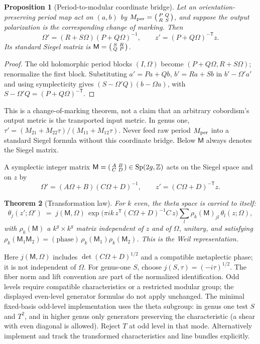 \documentclass[11pt]{article}
\newtheorem{theorem}{Theorem}[section]
\newtheorem{proposition}[theorem]{Proposition}
\theoremstyle{definition}
\theoremstyle{remark}
\newcommand{\Z}{\mathbb{Z}}
\newcommand{\R}{\mathbb{R}}
\newcommand{\C}{\mathbb{C}}
\newcommand{\Sp}{\operatorname{Sp}}
\begin{document}
\begin{proposition}[Period-to-modular coordinate bridge]\label{prop:coordinate-bridge}
Let an orientation-preserving period map act on $(a,b)$ by
$M_{\rm per}=\begin{psmallmatrix}P&Q\\R&S\end{psmallmatrix}$, and suppose
the output polarization is the corresponding change of marking. Then
\[
 \Omega'=(R+S\Omega)(P+Q\Omega)^{-1},\qquad
 z'=(P+Q\Omega)^{-\mathsf T}z .
\]
Its standard Siegel matrix is
$\mathsf M=\begin{psmallmatrix}S&R\\Q&P\end{psmallmatrix}$.
\end{proposition}
\begin{proof}
The old holomorphic period blocks $(I,\Omega)$ become
$(P+Q\Omega,R+S\Omega)$; renormalize the first block.
Substituting $a'=Pa+Qb$, $b'=Ra+Sb$ in $b'-\Omega'a'$ and using
symplecticity gives $(S-\Omega'Q)(b-\Omega a)$, with
$S-\Omega'Q=(P+Q\Omega)^{-\mathsf T}$.
\end{proof}
This is a change-of-marking theorem, not a claim that an arbitrary
cobordism's output metric is the transported input metric. In genus one,
$\tau'=(M_{21}+M_{22}\tau)/(M_{11}+M_{12}\tau)$.
Never feed raw period $M_{\rm per}$ into a standard Siegel formula without
this coordinate bridge. Below $\mathsf M$ always denotes the Siegel matrix.

A symplectic integer matrix $\mathsf M = \begin{psmallmatrix}A&B\\C&D\end{psmallmatrix}
\in \Sp(2g,\Z)$ acts on the Siegel space and on $z$ by
\[
  \Omega' = (A\Omega+B)(C\Omega+D)^{-1}, \qquad z' = (C\Omega+D)^{-\mathsf T} z .
\]

\begin{theorem}[Transformation law]\label{thm:weil}
For $k$ even, the theta space is carried to itself:
\[
  \theta_j(z';\Omega') \;=\; j(\mathsf M,\Omega)\,\exp\!\big(\pi i k\, z^{\mathsf T}(C\Omega+D)^{-1}C\,z\big)
  \sum_l \rho_k(\mathsf M)_{jl}\,\theta_l(z;\Omega),
\]
with $\rho_k(\mathsf M)$ a $k^g\times k^g$ matrix independent of $z$ and of
$\Omega$, unitary, and satisfying $\rho_k(\mathsf M_1\mathsf M_2) = (\text{phase})\,
\rho_k(\mathsf M_1)\rho_k(\mathsf M_2)$. This is the \emph{Weil representation}.
\end{theorem}

Here $j(\mathsf M,\Omega)$ includes $\det(C\Omega+D)^{1/2}$ and a compatible
metaplectic phase; it is not independent of $\Omega$. For genus-one $S$,
choose $j(S,\tau)=(-i\tau)^{1/2}$. The fiber norm and lift convention are
part of the normalized identification. Odd levels require compatible
characteristics or a restricted modular group; the displayed even-level
generator formulas do not apply unchanged. The minimal fixed-basis odd-level
implementation uses the theta subgroup: in genus one test $S$ and $T^2$,
and in higher genus only generators preserving the characteristic (a shear
with even diagonal is allowed). Reject $T$ at odd level in that mode.
Alternatively implement and track the transformed characteristics and
line bundles explicitly.
\end{document}
